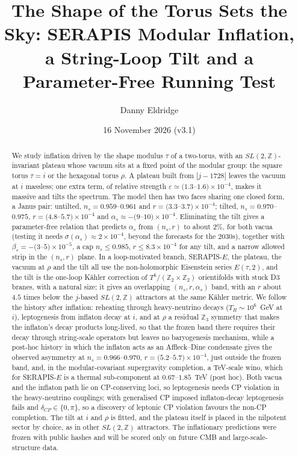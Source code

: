 \documentclass[aps,prd,twocolumn,superscriptaddress,nofootinbib,floatfix]{revtex4-2}
\begin{document}
\title{The Shape of the Torus Sets the Sky: SERAPIS Modular Inflation, a String-Loop Tilt and a Parameter-Free Running Test}
\author{Danny Eldridge}
\date{16 November 2026 (v3.1)}
\begin{abstract}
We study inflation driven by the shape modulus $\tau$ of a two-torus, with an $SL(2,\mathbb{Z})$-invariant plateau whose vacuum sits at a fixed point of the modular group: the square torus $\tau=i$ or the hexagonal torus $\rho$. A plateau built from $|j-1728|$ leaves the vacuum at $i$ massless; one extra term, of relative strength $\varepsilon\simeq(1.3$--$1.6)\times10^{-4}$, makes it massive and tilts the spectrum. The model then has two faces sharing one closed form, a Janus pair: untilted, $n_s=0.959$--$0.961$ and $r=(3.3$--$3.7)\times10^{-4}$; tilted, $n_s=0.970$--$0.975$, $r=(4.8$--$5.7)\times10^{-4}$ and $\alpha_s\approx-(9$--$10)\times10^{-4}$. Eliminating the tilt gives a parameter-free relation that predicts $\alpha_s$ from $(n_s,r)$ to about $2\%$, for both vacua (testing it needs $\sigma(\alpha_s)\approx2\times10^{-4}$, beyond the forecasts for the 2030s), together with $\beta_s=-(3$--$5)\times10^{-5}$, a cap $n_s\le0.985$, $r\le8.3\times10^{-4}$ for any tilt, and a narrow allowed strip in the $(n_s,r)$ plane. In a loop-motivated branch, SERAPIS-$E$, the plateau, the vacuum at $\rho$ and the tilt all use the non-holomorphic Eisenstein series $E(\tau,2)$, and the tilt is the one-loop K\"ahler correction of $T^6/(\mathbb{Z}_2\times\mathbb{Z}_2)$ orientifolds with stuck D3 branes, with a natural size; it gives an overlapping $(n_s,r,\alpha_s)$ band, with an $r$ about $4.5$ times below the $j$-based $SL(2,\mathbb{Z})$ attractors at the same K\"ahler metric. We follow the history after inflation: reheating through heavy-neutrino decays ($T_R\sim10^6$~GeV at $i$), leptogenesis from inflaton decay at $i$, and at $\rho$ a residual $\mathbb{Z}_3$ symmetry that makes the inflaton's decay products long-lived, so that the frozen band there requires their decay through string-scale operators but leaves no baryogenesis mechanism, while a post-hoc history in which the inflaton acts as an Affleck--Dine condensate gives the observed asymmetry at $n_s=0.966$--$0.970$, $r=(5.2$--$5.7)\times10^{-4}$, just outside the frozen band, and, in the modular-covariant supergravity completion, a TeV-scale wino, which for SERAPIS-$E$ is a thermal sub-component at $0.67$--$1.85$~TeV (post hoc). Both vacua and the inflaton path lie on CP-conserving loci, so leptogenesis needs CP violation in the heavy-neutrino couplings; with generalised CP imposed inflaton-decay leptogenesis fails and $\delta_{CP}\in\{0,\pi\}$, so a discovery of leptonic CP violation favours the non-CP completion. The tilt at $i$ and $\rho$ is fitted, and the plateau itself is placed in the nilpotent sector by choice, as in other $SL(2,\mathbb{Z})$ attractors. The inflationary predictions were frozen with public hashes and will be scored only on future CMB and large-scale-structure data.
\end{abstract}
\maketitle
\end{document}
